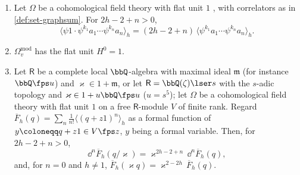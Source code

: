 
\begin{lem}
\label{lem:set-dilaton}
\begin{enumerate}
\item Let $\Omega$ be a cohomological field theory with flat unit $1$ \cite[Def.~0.3~(i)--(iii)]{PPZ15}, with correlators as in \cref{def:set-graphsum}. For $2h-2+n>0$,
\[
\langle\psi1\cdot\psi^{k_1}a_1\cdots\psi^{k_n}a_n\rangle_h=(2h-2+n)\,\langle\psi^{k_1}a_1\cdots\psi^{k_n}a_n\rangle_h .
\]
\item $\Omega^{\mathrm{mod}}_v$ has the flat unit $H^0=1$.
\item Let $\mathsf R$ be a complete local $\bbQ$-algebra with maximal ideal $\mathfrak m$ (for instance $\bbQ\fps u$) and $\varkappa\in1+\mathfrak m$, or let $\mathsf R=\bbQ(\zeta)\lser s$ with the $s$-adic topology and $\varkappa\in1+u\bbQ\fps u$ ($u=s^5$); let $\Omega$ be a cohomological field theory with flat unit $1$ on a free $\mathsf R$-module $V$ of finite rank. Regard $\overline F_h(q)=\sum_n\frac1{n!}\langle(q+z1)^n\rangle_h$ as a formal function of $y\coloneqq q+z1\in V\fps z$, $y$ being a formal variable. Then, for $2h-2+n>0$,
\[
\dd^n\overline F_h(q/\varkappa)=\varkappa^{2h-2+n}\,\dd^n\overline F_h(q),
\]
and, for $n=0$ and $h\neq1$, $\overline F_h(\varkappa q)=\varkappa^{2-2h}\,\overline F_h(q)$.
\end{enumerate}
\end{lem}

